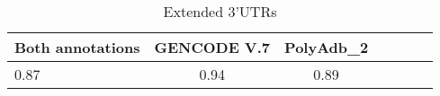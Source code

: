 \begin{table}
    \centering
    \begin{tabular}{lcccccc}
    \hline
    
        \textbf{ Both annotations } 
        
           &
        
    
        \textbf{ GENCODE V.7 } 
        
           &
        
    
        \textbf{ PolyAdb_2 } 
        
     
    \\
    \hline
    
        
            0.87
             
               &
            
        
            0.94
             
               &
            
        
            0.89
            
        
        \\
    
    \hline
    \end{tabular}
    \caption{Extended 3'UTRs}
    \label{tab:extension}
\end{table}
